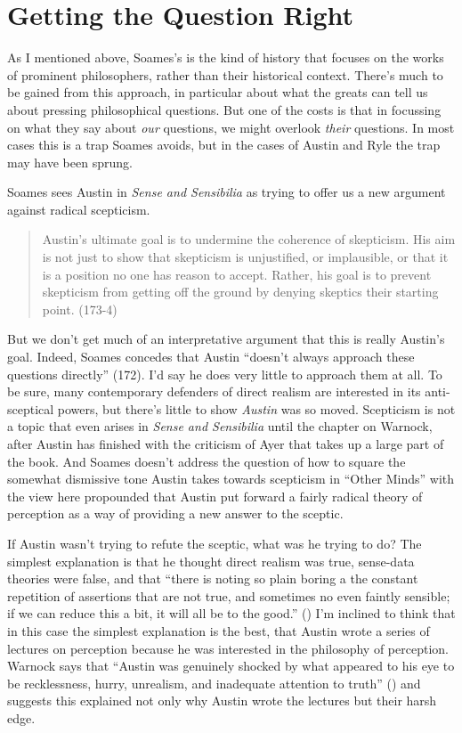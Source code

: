 \documentclass[
  11pt,
  letterpaper,
  DIV=11,
  numbers=noendperiod,
  twoside]{scrartcl}
\begin{document}
\section{Getting the Question Right}\label{getting-the-question-right}

As I mentioned above, Soames's is the kind of history that focuses on
the works of prominent philosophers, rather than their historical
context. There's much to be gained from this approach, in particular
about what the greats can tell us about pressing philosophical
questions. But one of the costs is that in focussing on what they say
about \emph{our} questions, we might overlook \emph{their} questions. In
most cases this is a trap Soames avoids, but in the cases of Austin and
Ryle the trap may have been sprung.

Soames sees Austin in \emph{Sense and Sensibilia} as trying to offer us
a new argument against radical scepticism.

\begin{quote}
Austin's ultimate goal is to undermine the coherence of skepticism. His
aim is not just to show that skepticism is unjustified, or implausible,
or that it is a position no one has reason to accept. Rather, his goal
is to prevent skepticism from getting off the ground by denying skeptics
their starting point. (173-4)
\end{quote}

But we don't get much of an interpretative argument that this is really
Austin's goal. Indeed, Soames concedes that Austin ``doesn't always
approach these questions directly'' (172). I'd say he does very little
to approach them at all. To be sure, many contemporary defenders of
direct realism are interested in its anti-sceptical powers, but there's
little to show \emph{Austin} was so moved. Scepticism is not a topic
that even arises in \emph{Sense and Sensibilia} until the chapter on
Warnock, after Austin has finished with the criticism of Ayer that takes
up a large part of the book. And Soames doesn't address the question of
how to square the somewhat dismissive tone Austin takes towards
scepticism in ``Other Minds'' with the view here propounded that Austin
put forward a fairly radical theory of perception as a way of providing
a new answer to the sceptic.

If Austin wasn't trying to refute the sceptic, what was he trying to do?
The simplest explanation is that he thought direct realism was true,
sense-data theories were false, and that ``there is noting so plain
boring a the constant repetition of assertions that are not true, and
sometimes no even faintly sensible; if we can reduce this a bit, it will
all be to the good.'' () I'm
inclined to think that in this case the simplest explanation is the
best, that Austin wrote a series of lectures on perception because he
was interested in the philosophy of perception. Warnock says that
``Austin was genuinely shocked by what appeared to his eye to be
recklessness, hurry, unrealism, and inadequate attention to truth''
() and suggests this
explained not only why Austin wrote the lectures but their harsh edge.
\end{document}
